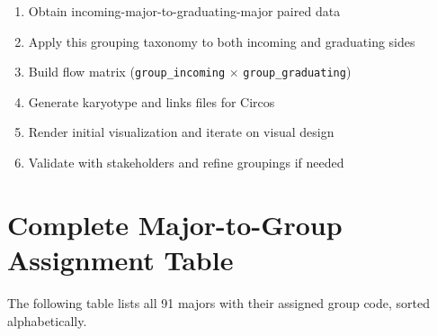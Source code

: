 \documentclass[
  11pt,
  letterpaper,
]{report}
\begin{document}
\begin{enumerate}
\item Obtain incoming-major-to-graduating-major paired data
\item Apply this grouping taxonomy to both incoming and graduating sides
\item Build flow matrix (\texttt{group\_incoming} $\times$ \texttt{group\_graduating})
\item Generate karyotype and links files for Circos
\item Render initial visualization and iterate on visual design
\item Validate with stakeholders and refine groupings if needed
\end{enumerate}

\appendix
\renewcommand{\thesection}{\Alph{section}}

\chapter{Complete Major-to-Group Assignment
Table}\label{sec-appendix-full}

The following table lists all 91 majors with their assigned group code,
sorted alphabetically.

\small
\renewcommand{\arraystretch}{1.1}
\end{document}
